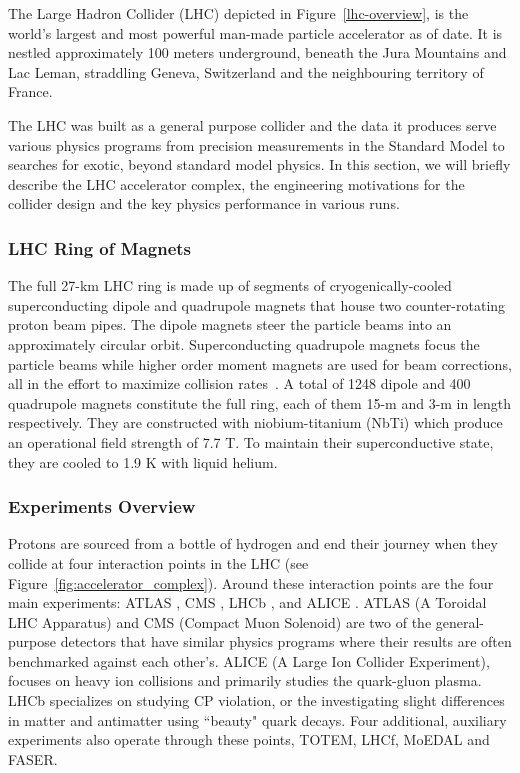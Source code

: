 The Large Hadron Collider (LHC) depicted in Figure~\ref{lhc-overview}, is the world's largest and most powerful man-made particle accelerator as of date. It is nestled approximately 100 meters underground, beneath the Jura Mountains and Lac Leman, straddling Geneva, Switzerland and the neighbouring territory of France.

The LHC was built as a general purpose collider and the data it produces serve various physics programs from precision measurements in the Standard Model to searches for exotic, beyond standard model physics. In this section, we will briefly describe the LHC accelerator complex, the engineering motivations for the collider design and the key physics performance in various runs.

\subsubsection{LHC Ring of Magnets}
The full 27-km LHC ring is made up of segments of cryogenically-cooled superconducting dipole and quadrupole magnets that house two counter-rotating proton beam pipes. The dipole magnets steer the particle beams into an approximately circular orbit. Superconducting quadrupole magnets focus the particle beams while higher order moment magnets are used for beam corrections, all in the effort to maximize collision rates~\cite{Rossi:2002ye}. A total of 1248 dipole and 400 quadrupole magnets constitute the full ring, each of them 15-m and 3-m in length respectively. They are constructed with niobium-titanium (NbTi) which produce an operational field strength of 7.7 T. To maintain their superconductive state, they are cooled to 1.9 K with liquid helium.

\subsubsection{Experiments Overview}
 
 Protons are sourced from a bottle of hydrogen and end their journey when they collide at four interaction points in the LHC (see Figure~\ref{fig:accelerator_complex}). Around these interaction points are the four main experiments: ATLAS \cite{ATLAS:2008xda}, CMS \cite{CMS:2008xjf}, LHCb \cite{LHCb:2008vvz}, and ALICE \cite{ALICE:2008ngc}. ATLAS (A Toroidal LHC Apparatus) and CMS (Compact Muon Solenoid) are two of the general-purpose detectors that have similar physics programs where their results are often benchmarked against each other's. ALICE (A Large Ion Collider Experiment), focuses on heavy ion collisions and primarily studies the quark-gluon plasma. LHCb specializes on studying CP violation, or the investigating slight differences in matter and antimatter using ``beauty" quark decays. Four additional, auxiliary experiments also operate through these points, TOTEM, LHCf, MoEDAL and FASER.  

